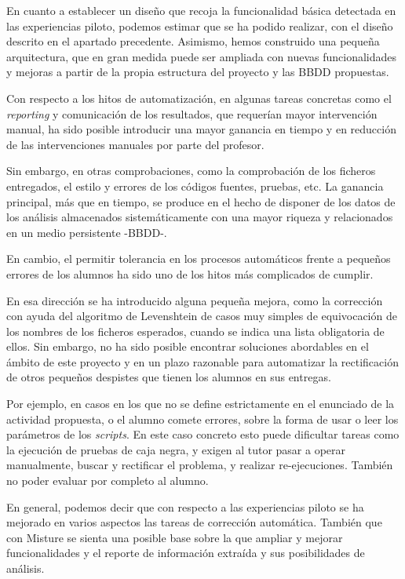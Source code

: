 En cuanto a establecer un diseño que recoja la funcionalidad básica detectada en las experiencias piloto, podemos estimar que se ha podido realizar, con el diseño descrito en el apartado precedente. Asimismo, hemos construido una pequeña arquitectura, que en gran medida puede ser ampliada con nuevas funcionalidades y mejoras a partir de la propia estructura del proyecto y las BBDD propuestas.


Con respecto a los hitos de automatización, en algunas tareas concretas como el \textit{reporting} y comunicación de los resultados, que requerían mayor intervención manual, ha sido posible introducir una mayor ganancia en tiempo y en reducción de las intervenciones manuales por parte del profesor.


Sin embargo, en otras comprobaciones, como la comprobación de los ficheros entregados, el estilo y errores de los códigos fuentes, pruebas, etc. La ganancia principal, más que en tiempo, se produce en el hecho de disponer de los datos de los análisis almacenados sistemáticamente con una mayor riqueza y relacionados en un medio persistente -BBDD-.


En cambio, el permitir tolerancia en los procesos automáticos frente a pequeños errores de los alumnos ha sido uno de los hitos más complicados de cumplir.


En esa dirección se ha introducido alguna pequeña mejora, como la corrección con ayuda del algoritmo de Levenshtein de casos muy simples de equivocación de los nombres de los ficheros esperados, cuando se indica una lista obligatoria de ellos. Sin embargo, no ha sido posible encontrar soluciones abordables en el ámbito de este proyecto y en un plazo razonable para automatizar la rectificación de otros pequeños despistes que tienen los alumnos en sus entregas.


Por ejemplo, en casos en los que no se define estrictamente en el enunciado de la actividad propuesta, o el alumno comete errores, sobre la forma de usar o leer los parámetros de los \textit{scripts}. En este caso concreto esto puede dificultar tareas como la ejecución de pruebas de caja negra, y exigen al tutor pasar a operar manualmente, buscar y rectificar el problema, y realizar re-ejecuciones. También no poder evaluar por completo al alumno.


En general, podemos decir que con respecto a las experiencias piloto se ha mejorado en varios aspectos las tareas de corrección automática. También que con Misture se sienta una posible base sobre la que ampliar y mejorar funcionalidades y el reporte de información extraída y sus posibilidades de análisis.

